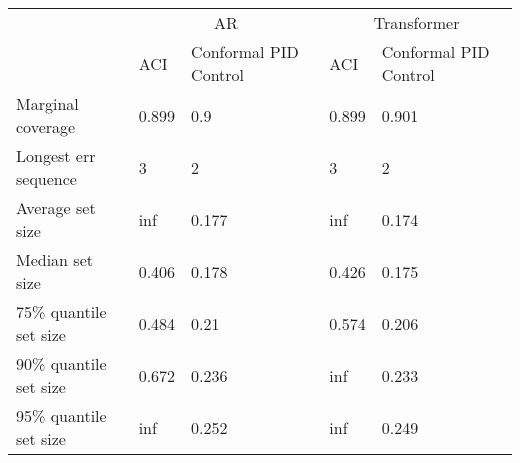 \begin{tabular}{lllll}
\toprule
& \multicolumn{2}{c}{AR}& \multicolumn{2}{c}{Transformer} \\
& ACI & Conformal PID Control & ACI & Conformal PID Control \\
\midrule
Marginal coverage & 0.899 & 0.9 & 0.899 & 0.901 \\
Longest err sequence & 3 & 2 & 3 & 2 \\
Average set size & inf & 0.177 & inf & 0.174 \\
Median set size & 0.406 & 0.178 & 0.426 & 0.175 \\
75\% quantile set size & 0.484 & 0.21 & 0.574 & 0.206 \\
90\% quantile set size & 0.672 & 0.236 & inf & 0.233 \\
95\% quantile set size & inf & 0.252 & inf & 0.249 \\
\bottomrule
\end{tabular}
